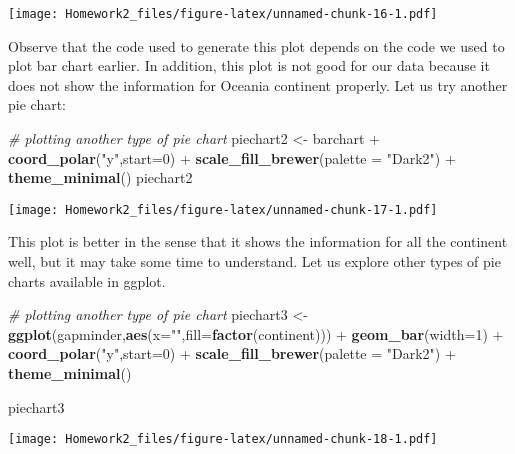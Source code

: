 \documentclass[]{article}
\newenvironment{Shaded}{\begin{snugshade}}{\end{snugshade}}
\newcommand{\KeywordTok}[1]{\textcolor[rgb]{0.13,0.29,0.53}{\textbf{{#1}}}}
\newcommand{\DataTypeTok}[1]{\textcolor[rgb]{0.13,0.29,0.53}{{#1}}}
\newcommand{\DecValTok}[1]{\textcolor[rgb]{0.00,0.00,0.81}{{#1}}}
\newcommand{\StringTok}[1]{\textcolor[rgb]{0.31,0.60,0.02}{{#1}}}
\newcommand{\CommentTok}[1]{\textcolor[rgb]{0.56,0.35,0.01}{\textit{{#1}}}}
\newcommand{\NormalTok}[1]{{#1}}
\begin{document}
\texttt{[image: Homework2\_files/figure-latex/unnamed-chunk-16-1.pdf]}

Observe that the code used to generate this plot depends on the code we
used to plot bar chart earlier. In addition, this plot is not good for
our data because it does not show the information for Oceania continent
properly. Let us try another pie chart:

\begin{Shaded}
\begin{Highlighting}[]
\CommentTok{# plotting another type of pie chart}
\NormalTok{piechart2 <-}\StringTok{ }\NormalTok{barchart +}\StringTok{ }
\StringTok{  }\KeywordTok{coord_polar}\NormalTok{(}\StringTok{"y"}\NormalTok{,}\DataTypeTok{start=}\DecValTok{0}\NormalTok{) +}\StringTok{ }
\StringTok{    }\KeywordTok{scale_fill_brewer}\NormalTok{(}\DataTypeTok{palette =} \StringTok{"Dark2"}\NormalTok{) +}\StringTok{ }
\StringTok{      }\KeywordTok{theme_minimal}\NormalTok{()  }
\NormalTok{piechart2}
\end{Highlighting}
\end{Shaded}

\texttt{[image: Homework2\_files/figure-latex/unnamed-chunk-17-1.pdf]}

This plot is better in the sense that it shows the information for all
the continent well, but it may take some time to understand. Let us
explore other types of pie charts available in ggplot.

\begin{Shaded}
\begin{Highlighting}[]
\CommentTok{# plotting another type of pie chart}
\NormalTok{piechart3 <-}\StringTok{ }\KeywordTok{ggplot}\NormalTok{(gapminder,}\KeywordTok{aes}\NormalTok{(}\DataTypeTok{x=}\StringTok{""}\NormalTok{,}\DataTypeTok{fill=}\KeywordTok{factor}\NormalTok{(continent))) +}\StringTok{ }\KeywordTok{geom_bar}\NormalTok{(}\DataTypeTok{width=}\DecValTok{1}\NormalTok{) +}
\StringTok{  }\KeywordTok{coord_polar}\NormalTok{(}\StringTok{"y"}\NormalTok{,}\DataTypeTok{start=}\DecValTok{0}\NormalTok{)  +}
\StringTok{    }\KeywordTok{scale_fill_brewer}\NormalTok{(}\DataTypeTok{palette =} \StringTok{"Dark2"}\NormalTok{)  +}
\StringTok{      }\KeywordTok{theme_minimal}\NormalTok{()  }

\NormalTok{piechart3}
\end{Highlighting}
\end{Shaded}

\texttt{[image: Homework2\_files/figure-latex/unnamed-chunk-18-1.pdf]}
\end{document}
